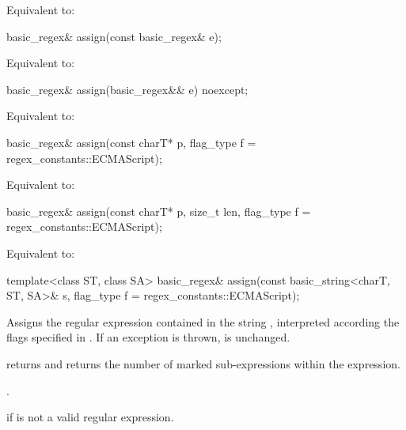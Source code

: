 \begin{itemdescr}
\pnum
\effects
Equivalent to: 
\end{itemdescr}

%
\begin{itemdecl}
basic_regex& assign(const basic_regex& e);
\end{itemdecl}

\begin{itemdescr}
\pnum
\effects
Equivalent to: 
\end{itemdescr}

%
\begin{itemdecl}
basic_regex& assign(basic_regex&& e) noexcept;
\end{itemdecl}

\begin{itemdescr}
\pnum
\effects
Equivalent to: 
\end{itemdescr}

%
\begin{itemdecl}
basic_regex& assign(const charT* p, flag_type f = regex_constants::ECMAScript);
\end{itemdecl}

\begin{itemdescr}
\pnum
\effects
Equivalent to: 
\end{itemdescr}

%
\begin{itemdecl}
basic_regex& assign(const charT* p, size_t len, flag_type f = regex_constants::ECMAScript);
\end{itemdecl}

\begin{itemdescr}
\pnum
\effects
Equivalent to: 
\end{itemdescr}

%
\begin{itemdecl}
template<class ST, class SA>
  basic_regex& assign(const basic_string<charT, ST, SA>& s,
                      flag_type f = regex_constants::ECMAScript);
\end{itemdecl}

\begin{itemdescr}
\pnum
\effects
Assigns the regular expression contained in the string
, interpreted according the flags specified in .
If an exception is thrown,  is unchanged.

\pnum
\ensures
{} returns  and 
returns the number of marked sub-expressions within the expression.

\pnum
\returns
{}.

\pnum
\throws
{} if  is not a valid regular expression.
\end{itemdescr}

